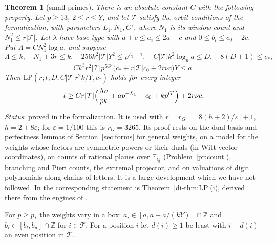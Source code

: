 \documentclass[reqno]{amsart}
\theoremstyle{definition}
\theoremstyle{plain}
\newtheorem{theorem}{Theorem}[section]
\theoremstyle{remark}
\newcommand{\Z}{\mathbb Z}
\newcommand{\F}{\mathbb F}
\newcommand{\LP}{\mathrm{LP}}
\begin{document}
\begin{theorem}[small primes]\label{thm:small}
There is an absolute constant \(C\) with the following property.  Let \(p\ge13\), \(2\le r\le Y\), and let \(\mathcal T\) satisfy the orbit conditions of the formalization, with parameters \(L_1,N_1,G'\), where \(N_1\) is its window count and \(N_1^2\le r\lvert\mathcal T\rvert\).  Let \(\lambda\) have base type with \(a+c\le a_i\le2a-c\) and \(0\le b_i\le c_0-2c\).  Put \(\Lambda=CN_1^2\log a\), and suppose
\[
 \Lambda\le k,\quad N_1+3r\le k,\quad 256k^2\lvert\mathcal T\rvert Y^2\le p^{L_1-1},\quad
 C\lvert\mathcal T\rvert k^2\log_pa\le D,\quad 8(D+1)\le c_*,
\]
\[
 Ck^3r^2\lvert\mathcal T\rvert p^{5G'}\bigl(c_*+r\lvert\mathcal T\rvert c_0+2r\nu c\bigr)Y\le a .
\]
Then \(\LP(r;t,D,C\lvert\mathcal T\rvert r^2k/Y,c_*)\) holds for every integer
\[
 t\ge Cr\lvert\mathcal T\rvert\Bigl(\frac{\Lambda a}{pk}+ap^{-L_1}+c_0+kp^{G'}\Bigr)+2r\nu c .
\]
\end{theorem}

\noindent\emph{Status}: proved in the formalization.  It is used with \(r=r_G=\lceil8(h+2)/\varepsilon\rceil+1\), \(h=2+8\varepsilon\); for \(\varepsilon=1/100\) this is \(r_G=3265\).  Its proof rests on the dual-basis and perfectness lemmas of Section~\ref{sec:forms} for general weights, on a model for the weights whose factors are symmetric powers or their duals (in Witt-vector coordinates), on counts of rational planes over \(\F_Q\) (Problem~\ref{pr:count}), branching and Pieri counts, the extremal projector, and on valuations of digit polynomials along chains of letters.  It is a large development which we have not followed.  In \cite{Adr} the corresponding statement is Theorem~\ref{di-thm:LP}(i), derived there from the engines of \cite[Hyp.~12.12]{Adr}.

For \(p\ge p_*\) the weights vary in a box: \(a_i\in[a,a+a/(kY)]\cap\Z\) and \(b_i\in[b_l,b_u]\cap\Z\) for \(i\in\mathcal T\).  For a position \(i\) let \(d(i)\ge1\) be least with \(i-d(i)\) an even position in \(\mathcal T\).
\end{document}
